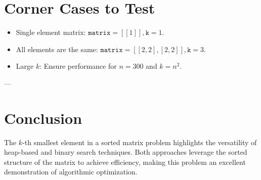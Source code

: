 \section*{Corner Cases to Test}
\begin{itemize}
    \item Single element matrix: \( \texttt{matrix} = [[1]], \texttt{k} = 1 \).
    \item All elements are the same: \( \texttt{matrix} = [[2, 2], [2, 2]], \texttt{k} = 3 \).
    \item Large \(k\): Ensure performance for \(n = 300\) and \(k = n^2\).
\end{itemize}

---

\section*{Conclusion}
The \(k\)-th smallest element in a sorted matrix problem highlights the versatility of heap-based and binary search techniques. Both approaches leverage the sorted structure of the matrix to achieve efficiency, making this problem an excellent demonstration of algorithmic optimization.